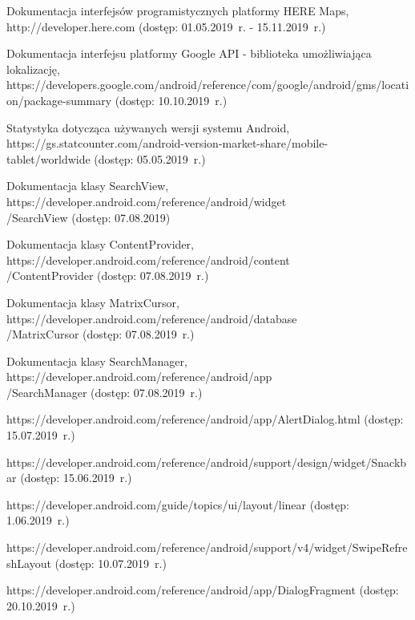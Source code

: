 \begin{thebibliography}{3}                      %
\small
{} Dokumentacja interfejsów programistycznych platformy HERE Maps, http://developer.here.com (dostęp: 01.05.2019~r. - 15.11.2019~r.)

   Dokumentacja interfejsu platformy Google API - biblioteka umożliwiająca lokalizację, https://developers.google.com/android/reference/com/google/android/gms/location/package-summary (dostęp: 10.10.2019~r.)

   Statystyka dotycząca używanych wersji systemu Android, https://gs.statcounter.com/android-version-market-share/mobile-tablet/worldwide (dostęp: 05.05.2019~r.)

   Dokumentacja klasy SearchView, https://developer.android.com/reference/android/widget\\/SearchView (dostęp: 07.08.2019)

   Dokumentacja klasy ContentProvider, https://developer.android.com/reference/android/content\\/ContentProvider (dostęp: 07.08.2019~r.)

   Dokumentacja klasy MatrixCursor, https://developer.android.com/reference/android/database\\/MatrixCursor (dostęp: 07.08.2019~r.)

   Dokumentacja klasy SearchManager, https://developer.android.com/reference/android/app\\/SearchManager (dostęp: 07.08.2019~r.)

   https://developer.android.com/reference/android/app/AlertDialog.html (dostęp: 15.07.2019~r.)
  
   https://developer.android.com/reference/android/support/design/widget/Snackbar (dostęp: 15.06.2019~r.)
  
   https://developer.android.com/guide/topics/ui/layout/linear (dostęp: 1.06.2019~r.)
  
   https://developer.android.com/reference/android/support/v4/widget/SwipeRefreshLayout (dostęp: 10.07.2019~r.)
  
   https://developer.android.com/reference/android/app/DialogFragment (dostęp: 20.10.2019~r.)
  

\end{thebibliography}
